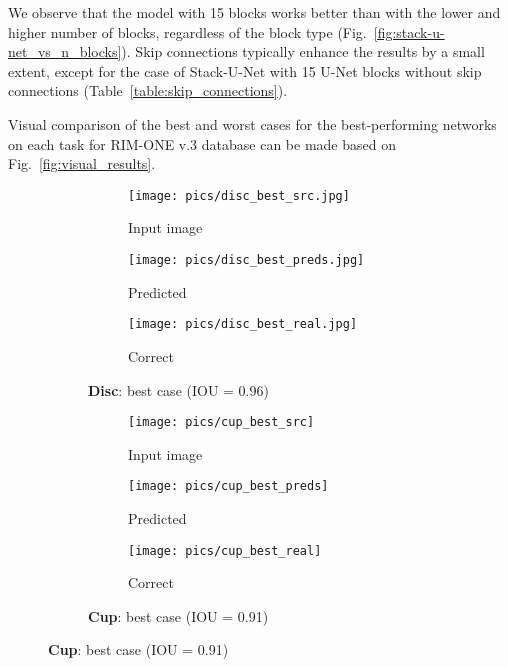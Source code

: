 \documentclass{llncs}
\begin{document}
We observe that the model with 15 blocks works better than with the lower and higher number of blocks, regardless of the block type (Fig.~\ref{fig:stack-u-net_vs_n_blocks}). Skip connections typically enhance the results by a small extent, except for the case of Stack-U-Net with 15 U-Net blocks without skip connections (Table~\ref{table:skip_connections}).


Visual comparison of the best and worst cases for the best-performing networks on each task for RIM-ONE v.3 database can be made based on Fig.~\ref{fig:visual_results}.
 


\begin{figure}[h!]
	\begin{subfigure}[t]{0.5\textwidth}
		\begin{subfigure}[t]{0.3\textwidth}
			\texttt{[image: pics/disc\_best\_src.jpg]} 
			\caption*{Input image}
		\end{subfigure}
		\begin{subfigure}[t]{0.3\textwidth}
			\texttt{[image: pics/disc\_best\_preds.jpg]} 
			\caption*{Predicted}
		\end{subfigure}
		\begin{subfigure}[t]{0.3\textwidth}
			\texttt{[image: pics/disc\_best\_real.jpg]} 
			\caption*{Correct}
		\end{subfigure}
		\caption*{\textbf{Disc}: best case (IOU = 0.96)}
	\end{subfigure}
	\hspace{0.15cm}
	\begin{subfigure}[t]{0.5\textwidth}
		\begin{subfigure}[t]{0.3\textwidth}
			\texttt{[image: pics/cup\_best\_src]} 
			\caption*{Input image}
		\end{subfigure}
		\begin{subfigure}[t]{0.3\textwidth}
			\texttt{[image: pics/cup\_best\_preds]} 
			\caption*{Predicted}
		\end{subfigure}
		\begin{subfigure}[t]{0.3\textwidth}
			\texttt{[image: pics/cup\_best\_real]} 
			\caption*{Correct}
		\end{subfigure}
		\caption*{\textbf{Cup}: best case (IOU = 0.91)}
	\end{subfigure}
	\vspace{0.2cm}
	

\end{figure}
\end{document}
